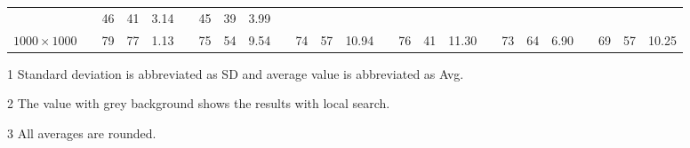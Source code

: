 \documentclass[preprint,5pt]{elsarticle}
\begin{document}
\begin{table}[htbp]
\begin{threeparttable}
\begin{center}
\begin{tabular}{ccccccccccccccccccccccccc}
                   &&{\cellcolor[rgb]{0.729,0.729,0.729}}46   &{\cellcolor[rgb]{0.729,0.729,0.729}}41      &{\cellcolor[rgb]{0.729,0.729,0.729}}3.14
                   &&45  &39  &3.99     \\
  $1000\times 1000$  &&{\cellcolor[rgb]{0.729,0.729,0.729}}79 &{\cellcolor[rgb]{0.729,0.729,0.729}}77  &{\cellcolor[rgb]{0.729,0.729,0.729}}1.13
                     &&75 &54  &9.54
                     &&{\cellcolor[rgb]{0.729,0.729,0.729}}74 &{\cellcolor[rgb]{0.729,0.729,0.729}}57 &{\cellcolor[rgb]{0.729,0.729,0.729}}10.94
                     &&76   &41      &11.30
                     &&{\cellcolor[rgb]{0.729,0.729,0.729}}73   &{\cellcolor[rgb]{0.729,0.729,0.729}}64      &{\cellcolor[rgb]{0.729,0.729,0.729}}6.90
                     &&69  &57  &10.25     \\
\hline\hline
\end{tabular}
\begin{tablenotes}
\item[1] Standard deviation is abbreviated as SD and average value is abbreviated as Avg.
\item[2] The value with grey background shows the results with local search.
\item[3] All averages are rounded.
\end{tablenotes}
\vspace{5pt}
\end{center}
\end{threeparttable}
\end{table}
\end{document}
